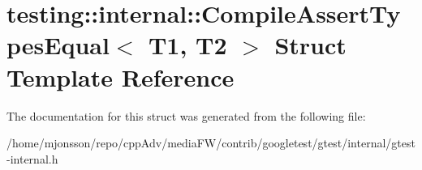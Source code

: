\hypertarget{structtesting_1_1internal_1_1CompileAssertTypesEqual}{}\section{testing\+:\+:internal\+:\+:Compile\+Assert\+Types\+Equal$<$ T1, T2 $>$ Struct Template Reference}
\label{structtesting_1_1internal_1_1CompileAssertTypesEqual}


The documentation for this struct was generated from the following file\+:\begin{DoxyCompactItemize}
\item 
/home/mjonsson/repo/cpp\+Adv/media\+F\+W/contrib/googletest/gtest/internal/gtest-\/internal.\+h\end{DoxyCompactItemize}
